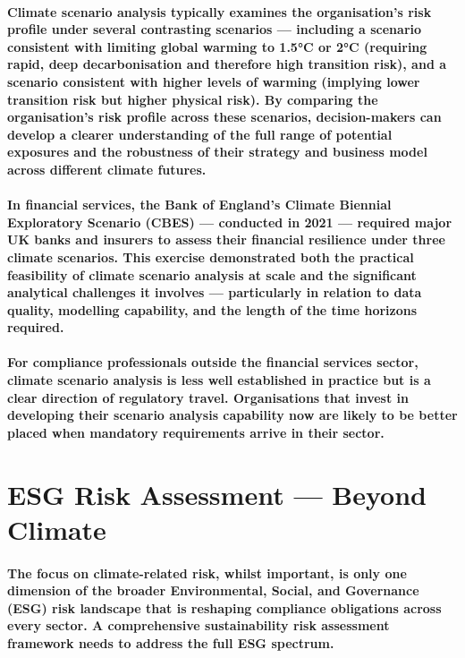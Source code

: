 \paragraph{Climate scenario analysis typically examines the organisation's risk profile under several contrasting scenarios — including a scenario consistent with limiting global warming to 1.5°C or 2°C (requiring rapid, deep decarbonisation and therefore high transition risk), and a scenario consistent with higher levels of warming (implying lower transition risk but higher physical risk). By comparing the organisation's risk profile across these scenarios, decision-makers can develop a clearer understanding of the full range of potential exposures and the robustness of their strategy and business model across different climate futures.}
\paragraph{In financial services, the \textbf{Bank of England's Climate Biennial Exploratory Scenario (CBES)} — conducted in 2021 — required major UK banks and insurers to assess their financial resilience under three climate scenarios. This exercise demonstrated both the practical feasibility of climate scenario analysis at scale and the significant analytical challenges it involves — particularly in relation to data quality, modelling capability, and the length of the time horizons required.}
\paragraph{For compliance professionals outside the financial services sector, climate scenario analysis is less well established in practice but is a clear direction of regulatory travel. Organisations that invest in developing their scenario analysis capability now are likely to be better placed when mandatory requirements arrive in their sector.}

\section{ESG Risk Assessment — Beyond Climate}
\paragraph{The focus on climate-related risk, whilst important, is only one dimension of the broader \textbf{Environmental, Social, and Governance (ESG)} risk landscape that is reshaping compliance obligations across every sector. A comprehensive sustainability risk assessment framework needs to address the full ESG spectrum.}

